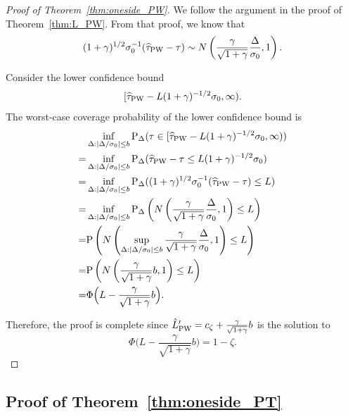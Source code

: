 \documentclass[11pt]{article}
\def\P{{\mathrm P}}
\newcommand{\htau}{\widehat\tau}
\numberwithin{equation}{section}
\theoremstyle{definition}
\begin{document}
\begin{proof}[Proof of Theorem~\ref{thm:oneside_PW}]

We follow the argument in the proof of Theorem~\ref{thm:L_PW}. From that proof, we know that
\begin{align*}
(1+\gamma)^{1/2} \sigma_0^{-1} (\htau_{\rm PW} - \tau) \sim N\left(\frac{\gamma}{\sqrt{1+\gamma}} \frac{\Delta}{\sigma_0}, 1\right).
\end{align*}

Consider the lower confidence bound
\[
  [\htau_{\rm PW} - L (1+\gamma)^{-1/2} \sigma_0, \infty).
\]
The worst-case coverage probability of the lower confidence bound is
\begin{align*}
  & \inf_{\Delta: \lvert \Delta/\sigma_0 \rvert \le b} \P_\Delta(\tau \in [\htau_{\rm PW} - L (1+\gamma)^{-1/2} \sigma_0, \infty))\\
  =& \inf_{\Delta: \lvert \Delta/\sigma_0 \rvert \le b} \P_\Delta(\htau_{\rm PW} - \tau \le L (1+\gamma)^{-1/2} \sigma_0)\\
  =& \inf_{\Delta: \lvert \Delta/\sigma_0 \rvert \le b} \P_\Delta((1+\gamma)^{1/2} \sigma_0^{-1} (\htau_{\rm PW} - \tau) \le L)\\
  =& \inf_{\Delta: \lvert \Delta/\sigma_0 \rvert \le b} \P_\Delta\left(N\left(\frac{\gamma}{\sqrt{1+\gamma}} \frac{\Delta}{\sigma_0}, 1\right) \le L\right)\\
  =& \P\left( N\left(\sup_{\Delta: \lvert \Delta/\sigma_0 \rvert \le b} \frac{\gamma}{\sqrt{1+\gamma}} \frac{\Delta}{\sigma_0}, 1\right) \le L \right)\\
  =& \P\left( N\left(\frac{\gamma}{\sqrt{1+\gamma}} b, 1\right) \le L \right)\\
  =& \Phi\Big(L - \frac{\gamma}{\sqrt{1+\gamma}} b \Big).
\end{align*}

Therefore, the proof is complete since $\hat{L}_{\rm PW}' = c_\zeta + \frac{\gamma}{\sqrt{1+\gamma}} b$ is the solution to
\[
  \Phi\Big(L - \frac{\gamma}{\sqrt{1+\gamma}} b \Big) = 1-\zeta.
\]  

\end{proof}


\subsection{Proof of Theorem~\ref{thm:oneside_PT}}
\end{document}
